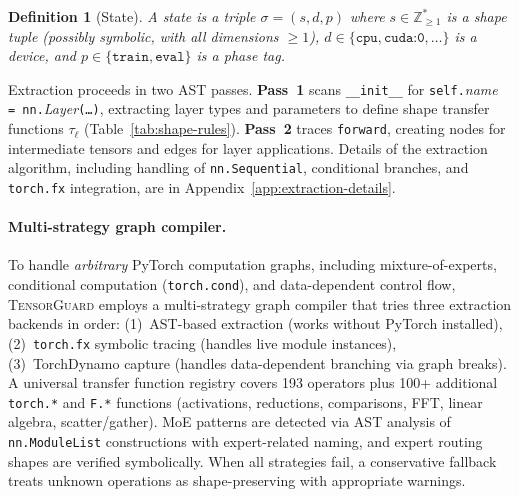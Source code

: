 \documentclass[11pt]{article}
\newtheorem{definition}[theorem]{Definition}
\begin{document}
\begin{definition}[State]\label{def:state}
A \emph{state} is a triple $\sigma = (s, d, p)$ where
$s \in \mathbb{Z}_{\geq 1}^*$ is a shape tuple (possibly symbolic, with all dimensions $\geq 1$),
$d \in \{\texttt{cpu}, \texttt{cuda:0}, \ldots\}$ is a device, and
$p \in \{\texttt{train}, \texttt{eval}\}$ is a phase tag.
\end{definition}

Extraction proceeds in two AST passes.
\textbf{Pass~1} scans \texttt{\_\_init\_\_} for
\texttt{self.}\textit{name}\texttt{ = nn.}\textit{Layer}\texttt{(\ldots)},
extracting layer types and parameters to define shape transfer functions
$\tau_\ell$ (Table~\ref{tab:shape-rules}).
\textbf{Pass~2} traces \texttt{forward}, creating nodes for intermediate
tensors and edges for layer applications.
Details of the extraction algorithm, including handling of
\texttt{nn.Sequential}, conditional branches, and \texttt{torch.fx}
integration, are in Appendix~\ref{app:extraction-details}.

\paragraph{Multi-strategy graph compiler.}
To handle \emph{arbitrary} PyTorch computation graphs, including
mixture-of-experts, conditional computation (\texttt{torch.cond}),
and data-dependent control flow, \textsc{TensorGuard} employs a
multi-strategy graph compiler that tries three extraction backends
in order: (1)~AST-based extraction (works without PyTorch installed),
(2)~\texttt{torch.fx} symbolic tracing (handles live module instances),
(3)~TorchDynamo capture (handles data-dependent branching via graph
breaks).  A universal transfer function registry covers 193 operators
plus 100+ additional \texttt{torch.*} and \texttt{F.*} functions
(activations, reductions, comparisons, FFT, linear algebra, scatter/gather).
MoE patterns are detected via AST analysis of \texttt{nn.ModuleList}
constructions with expert-related naming, and expert routing shapes
are verified symbolically.  When all strategies fail, a conservative
fallback treats unknown operations as shape-preserving with appropriate
warnings.
\end{document}
